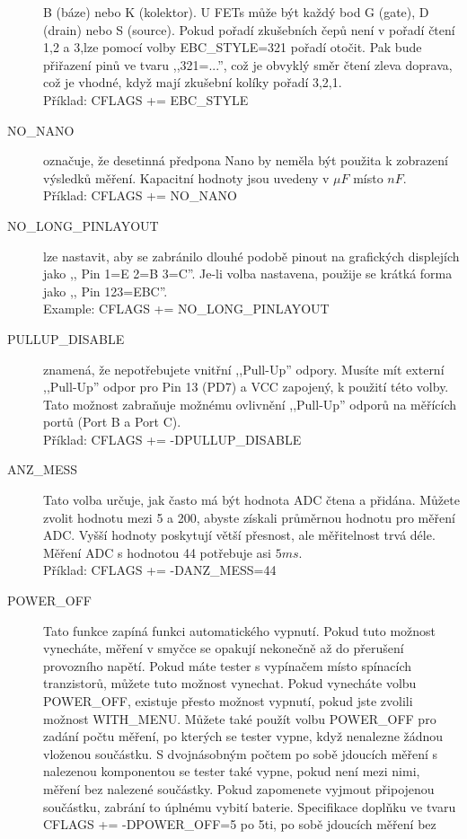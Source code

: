 \begin{description}
B (báze) nebo K (kolektor).
U FETs může být každý bod G (gate), D (drain) nebo S (source).
Pokud pořadí zkušebních čepů není v pořadí čtení 1,2 a 3,lze pomocí volby EBC\_STYLE=321 pořadí otočit.
Pak  bude přiřazení pinů ve tvaru ,,321=...'', což je obvyklý směr čtení zleva doprava, což je vhodné,
 když mají zkušební kolíky pořadí 3,2,1.\\
Příklad: CFLAGS += EBC\_STYLE
  \item[NO\_NANO] označuje, že desetinná předpona Nano by neměla být použita k zobrazení výsledků měření.
Kapacitní hodnoty jsou uvedeny v \(\mu F\) místo \(nF\).\\
Příklad: CFLAGS += NO\_NANO
  \item[NO\_LONG\_PINLAYOUT] lze nastavit, aby se zabránilo dlouhé podobě pinout na grafických displejích
jako ,, Pin  1=E 2=B 3=C''.
Je-li volba nastavena, použije se krátká forma jako ,, Pin  123=EBC''.\\
Example: CFLAGS += NO\_LONG\_PINLAYOUT
  \item[PULLUP\_DISABLE] znamená, že nepotřebujete vnitřní ,,Pull-Up'' odpory.
 Musíte mít externí ,,Pull-Up'' odpor pro Pin 13 (PD7) a VCC zapojený, k použití této volby.
Tato možnost zabraňuje možnému ovlivnění ,,Pull-Up'' odporů na měřících portů (Port B a Port C).\\
Příklad: CFLAGS += -DPULLUP\_DISABLE
  \item[ANZ\_MESS] Tato volba určuje, jak často má být hodnota ADC čtena a přidána.
Můžete zvolit hodnotu mezi 5 a 200, abyste získali průměrnou hodnotu pro měření ADC.
Vyšší hodnoty poskytují větší přesnost, ale měřitelnost trvá déle.
Měření ADC s hodnotou 44 potřebuje asi \(5ms\).\\
Příklad: CFLAGS += -DANZ\_MESS=44
  \item[POWER\_OFF] Tato funkce zapíná funkci automatického vypnutí.
Pokud tuto možnost vynecháte, měření v smyčce se opakují nekonečně až do přerušení provozního napětí.
Pokud máte tester s vypínačem místo spínacích tranzistorů, můžete tuto možnost vynechat.
Pokud vynecháte volbu POWER\_OFF, existuje přesto možnost vypnutí, pokud jste zvolili možnost WITH\_MENU.
Můžete také použít volbu POWER\_OFF pro zadání počtu měření, po kterých se tester vypne,
když nenalezne žádnou vloženou součástku.
S dvojnásobným počtem po sobě jdoucích měření s nalezenou komponentou se tester také vypne,
pokud není mezi nimi, měření bez nalezené součástky.
Pokud zapomenete vyjmout připojenou součástku, zabrání to úplnému vybití baterie.
Specifikace doplňku ve tvaru  CFLAGS += -DPOWER\_OFF=5 po 5ti, po sobě jdoucích měření bez

\end{description}
